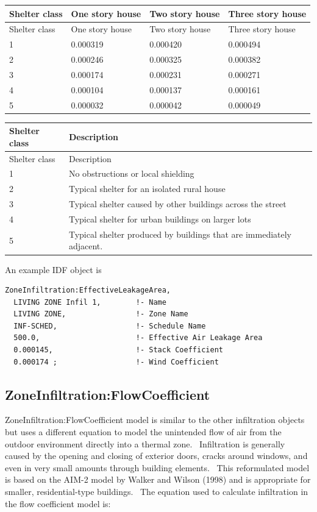 \begin{longtable}[c]{@{}llll@{}}
\toprule
Shelter class & One story house & Two story house & Three story house \tabularnewline
\midrule
\endfirsthead

\toprule
Shelter class & One story house & Two story house & Three story house \tabularnewline
\midrule
\endhead

1 & 0.000319 & 0.000420 & 0.000494 \tabularnewline
2 & 0.000246 & 0.000325 & 0.000382 \tabularnewline
3 & 0.000174 & 0.000231 & 0.000271 \tabularnewline
4 & 0.000104 & 0.000137 & 0.000161 \tabularnewline
5 & 0.000032 & 0.000042 & 0.000049 \tabularnewline
\bottomrule
\end{longtable}

\begin{longtable}[c]{p{1.5in}p{4.5in}}
\toprule
Shelter class & Description \tabularnewline
\midrule
\endfirsthead

\toprule
Shelter class & Description \tabularnewline
\midrule
\endhead

1 & No obstructions or local shielding \tabularnewline
2 & Typical shelter for an isolated rural house \tabularnewline
3 & Typical shelter caused by other buildings across the street \tabularnewline
4 & Typical shelter for urban buildings on larger lots \tabularnewline
5 & Typical shelter produced by buildings that are immediately adjacent. \tabularnewline
\bottomrule
\end{longtable}

An example IDF object is

\begin{lstlisting}
ZoneInfiltration:EffectiveLeakageArea,
  LIVING ZONE Infil 1,        !- Name
  LIVING ZONE,                !- Zone Name
  INF-SCHED,                  !- Schedule Name
  500.0,                      !- Effective Air Leakage Area
  0.000145,                   !- Stack Coefficient
  0.000174 ;                  !- Wind Coefficient
\end{lstlisting}

\subsection{ZoneInfiltration:FlowCoefficient}\label{zoneinfiltrationflowcoefficient}

ZoneInfiltration:FlowCoefficient model is similar to the other infiltration objects but uses a different equation to model the unintended flow of air from the outdoor environment directly into a thermal zone.~ Infiltration is generally caused by the opening and closing of exterior doors, cracks around windows, and even in very small amounts through building elements.~ This reformulated model is based on the AIM-2 model by Walker and Wilson (1998) and is appropriate for smaller, residential-type buildings.~ The equation used to calculate infiltration in the flow coefficient model is:

